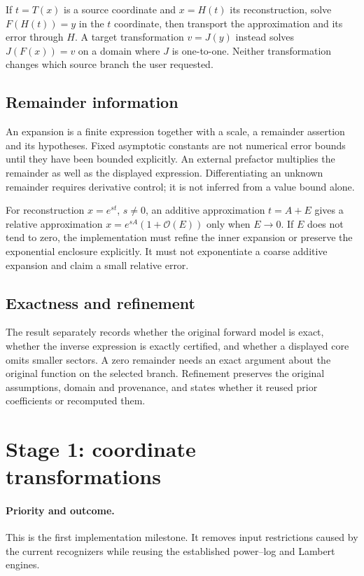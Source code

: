 \documentclass[11pt,a4paper]{article}
\newcommand{\OO}{\mathcal O}
\begin{document}
If $t=T(x)$ is a source coordinate and $x=H(t)$ its reconstruction, solve $F(H(t))=y$ in the $t$ coordinate, then transport the approximation and its error through $H$. A target transformation $v=J(y)$ instead solves $J(F(x))=v$ on a domain where $J$ is one-to-one. Neither transformation changes which source branch the user requested.

\subsection{Remainder information}

An expansion is a finite expression together with a scale, a remainder assertion and its hypotheses. Fixed asymptotic constants are not numerical error bounds until they have been bounded explicitly. An external prefactor multiplies the remainder as well as the displayed expression. Differentiating an unknown remainder requires derivative control; it is not inferred from a value bound alone.

For reconstruction $x=e^{s t}$, $s\ne0$, an additive approximation $t=A+E$ gives a relative approximation $x=e^{sA}(1+\OO(E))$ only when $E\to0$. If $E$ does not tend to zero, the implementation must refine the inner expansion or preserve the exponential enclosure explicitly. It must not exponentiate a coarse additive expansion and claim a small relative error.

\subsection{Exactness and refinement}

The result separately records whether the original forward model is exact, whether the inverse expression is exactly certified, and whether a displayed core omits smaller sectors. A zero remainder needs an exact argument about the original function on the selected branch. Refinement preserves the original assumptions, domain and provenance, and states whether it reused prior coefficients or recomputed them.

\section{Stage 1: coordinate transformations}

\paragraph{Priority and outcome.} This is the first implementation milestone. It removes input restrictions caused by the current recognizers while reusing the established power--log and Lambert engines.
\end{document}
